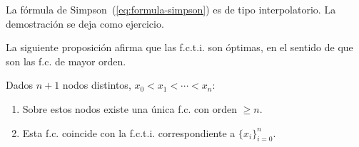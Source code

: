 \begin{example}
  La fórmula de Simpson~(\ref{eq:formula-simpson}) es de tipo
  interpolatorio. La demostración se deja como ejercicio.
\end{example}

La siguiente proposición afirma que las f.c.t.i. son óptimas, en el
sentido de que son las f.c. de mayor orden.
\begin{proposition}
  \label{pro:existencia.fcti}
  Dados $n+1$ nodos distintos, $x_0<x_1<\cdots<x_n$:
  \begin{enumerate}
  \item Sobre estos nodos existe una única f.c. con orden $\ge
    n$.
  \item Esta f.c. coincide con la f.c.t.i. correspondiente a
    $\{x_i\}_{i=0}^n$.
  \end{enumerate}
\end{proposition}
